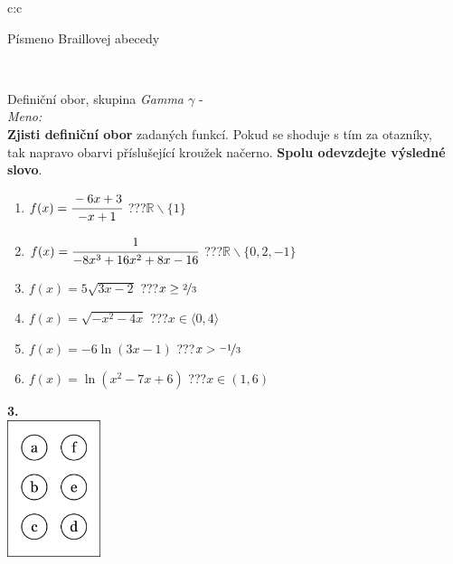 \documentclass[10pt]{report}
\begin{document}
\begin{tabular}{c:c}
\begin{minipage}[c][99mm][t]{0.49\linewidth}
\begin{center}
\begin{minipage}{0.20\linewidth}
\begin{center}
{\small Písmeno Braillovej abecedy}
\end{center}
\end{minipage}
\end{center}
\end{minipage}
\\ \hdashline
\begin{minipage}[c][99mm][t]{0.49\linewidth}
\begin{center}
\vspace{7mm}
{\huge Definiční obor, skupina \textit{Gamma $\gamma$} -}\\[4.5mm]
\textit{Meno:}\phantom{xxxxxxxxxxxxxxxxxxxxxxxxxxxxxxxxxxxxxxxxxxxxxxxxxxxxxxxxxxxxxxxxx}\\[3.5mm]
\textbf{Zjisti definiční obor} zadaných funkcí. Pokud se shoduje s tím za otazníky,\\tak napravo obarvi příslušející kroužek načerno. \textbf{Spolu odevzdejte výsledné slovo}.\\[3mm]
\begin{minipage}{0.77\linewidth}
\begin{center}
\begin{varwidth}{\textwidth}
\begin{enumerate}
\normalsize
\item $f(x)=\cfrac{-6x+3}{-x+1}$\quad \dotfill\; ???\;\dotfill \quad $\mathbb{R}\smallsetminus\{1\}$
\item $f(x)=\cfrac{1}{-8x^3+16x^2+8x-16}$\quad \dotfill\; ???\;\dotfill \quad $\mathbb{R}\smallsetminus\{0,2,-1\}$
\item $f(x)=5\sqrt{3x-2}$\quad \dotfill\; ???\;\dotfill \quad $x\geq\nicefrac{2}{3}$
\item $f(x)=\sqrt{-x^2-4x}$\quad \dotfill\; ???\;\dotfill \quad $x\in\langle0 , 4\rangle$
\item $f(x)=-6\ln{(3x-1)}$\quad \dotfill\; ???\;\dotfill \quad $x>\nicefrac{-1}{3}$
\item $f(x)=\ln{(x^2-7x+6)}$\quad \dotfill\; ???\;\dotfill \quad $x\in(1 , 6)$
\end{enumerate}
\end{varwidth}
\end{center}
\end{minipage}
\begin{minipage}{0.20\linewidth}
\begin{center}
{\Huge\bfseries 3.} \\[2mm]
\includegraphics[height=40mm]{../images/braille.png}

\end{center}
\end{minipage}
\end{center}
\end{minipage}
\end{tabular}
\end{document}
